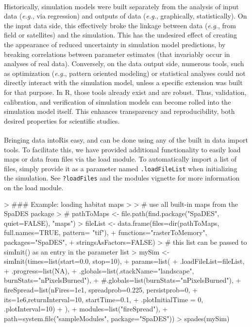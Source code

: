 \documentclass{article}
\begin{document}
\paragraph{}
Historically, simulation models were built separately from the analysis of input data (\textit{e.g.}, via regression) and outputs of data (\textit{e.g.}, graphically, statistically). On the input data side, this effectively broke the linkage between data (\textit{e.g.}, from field or satellites) and the simulation. This has the undesired effect of creating the appearance of reduced uncertainty in simulation model predictions, by breaking correlations between parameter estimates (that invariably occur in analyses of real data). Conversely, on the data output side, numerous tools, such as optimization (\textit{e.g.}, pattern oriented modeling) or statistical analyses could not directly interact with the simulation model, unless a specific extension was built for that purpose. In R, those tools already exist and are robust. Thus, validation, calibration, and verification of simulation models can become rolled into the simulation model itself. This enhances transparency and reproducibility, both desired properties for scientific studies.

\paragraph{}
Bringing data into\textsf{R}is easy, and can be done using any of the built in data import tools. To facilitate this, we have provided additional functionality to easily load maps or data from files via the load module. To automatically import a list of files, simply provide it as a parameter named \texttt{.loadFileList} when initializing the simulation. See \texttt{?loadFiles} and the modules vignette for more information on the load module.

\begin{Schunk}
\begin{Sinput}
> ### Example: loading habitat maps
> 
> # use all built-in maps from the SpaDES package
> # pathToMaps <- file.path(find.package("SpaDES", quiet=FALSE), "maps")
> fileList <- data.frame(files=dir(pathToMaps, full.names=TRUE, pattern= "tif"),
+                       functions="rasterToMemory", packages="SpaDES",
+                       stringsAsFactors=FALSE)
> # this list can be passed to simInit() as an entry in the parameter list
> mySim <- simInit(times=list(start=0.0, stop=10),
+                  params=list(
+                    .loadFileList=fileList,
+                    .progress=list(NA),
+                    .globals=list(.stackName="landscape", burnStats="nPixelsBurned"),
+                    #.globals=list(burnStats="nPixelsBurned"),
+                    fireSpread=list(nFires=1e1, spreadprob=0.225, persistprob=0,
+                                    its=1e6,returnInterval=10, startTime=0.1,
+                                    .plotInitialTime = 0, .plotInterval=10)
+                  ),
+                  modules=list("fireSpread"),
+                  path=system.file("sampleModules", package="SpaDES"))
> spades(mySim)
\end{Sinput}
\end{Schunk}
\end{document}
